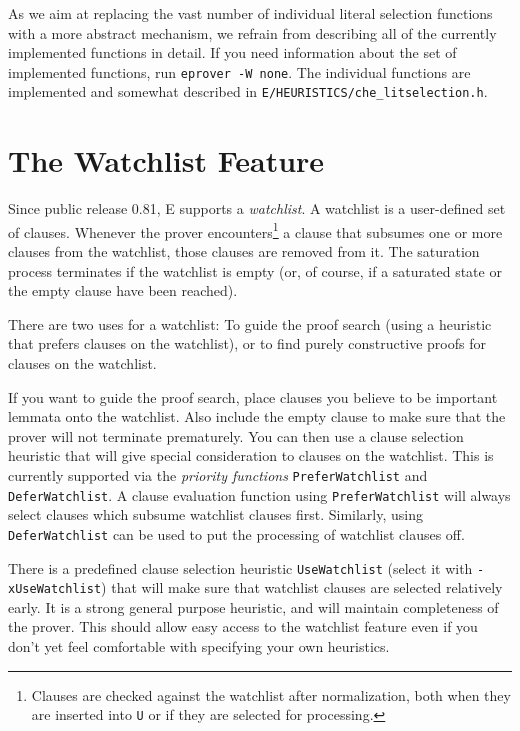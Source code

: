 \documentclass{report}
\begin{document}
As we aim at replacing the vast number of individual literal selection
functions with a more abstract mechanism, we refrain from describing
all of the currently implemented functions in detail. If you need
information about the set of implemented functions, run
\texttt{eprover -W none}. The individual functions are implemented and
somewhat described in \texttt{E/HEURISTICS/che\_litselection.h}.


\section{The Watchlist Feature}
\label{sec:options:watchlist}

Since public release 0.81, E supports a \emph{watchlist}. A watchlist
is a user-defined set of clauses. Whenever the prover
encounters\footnote{Clauses are checked against the watchlist after
  normalization, both when they are inserted into \texttt{U} or if
  they are selected for processing.} a clause that subsumes one or
more clauses from the watchlist, those clauses are removed from it.
The saturation process terminates if the watchlist is empty (or, of
course, if a saturated state or the empty clause have been reached).

There are two uses for a watchlist: To guide the proof search (using a
heuristic that prefers clauses on the watchlist), or to find purely
constructive proofs for clauses on the watchlist.

If you want to guide the proof search, place clauses you believe to be
important lemmata onto the watchlist. Also include the empty clause to
make sure that the prover will not terminate prematurely.  You can
then use a clause selection heuristic that will give special
consideration to clauses on the watchlist. This is currently supported
via the \emph{priority functions} \texttt{PreferWatchlist} and
\texttt{DeferWatchlist}. A clause evaluation function using
\texttt{PreferWatchlist} will always select clauses which subsume
watchlist clauses first. Similarly, using \texttt{DeferWatchlist} can
be used to put the processing of watchlist clauses off.

There is a predefined clause selection heuristic \texttt{UseWatchlist}
(select it with \texttt{-xUseWatchlist}) that will make sure that
watchlist clauses are selected relatively early. It is a strong
general purpose heuristic, and will maintain completeness of the
prover. This should allow easy access to the watchlist feature even
if you don't yet feel comfortable with specifying your own
heuristics.
\end{document}
